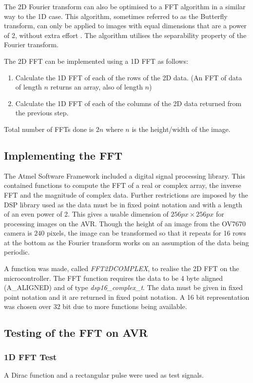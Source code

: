 The 2D Fourier transform can also be optimised to a FFT algorithm in a similar way to the 1D case. This algorithm, sometimes referred to as the Butterfly transform, can only be applied to images with equal dimensions that are a power of 2, without extra effort \citep{nixon2012feature}. The algorithm utilises the separability property of the Fourier transform. 

The 2D FFT can be implemented using a 1D FFT as follows:
\begin{enumerate}
\item Calculate the 1D FFT of each of the rows of the 2D data. (An FFT of data of length $n$ returns an array, also of length $n$)
\item Calculate the 1D FFT of each of the columns of the 2D data returned from the previous step.
\end{enumerate}
Total number of FFTs done is $2n$ where $n$ is the height/width of the image. 
\subsection{Implementing the FFT}
The Atmel Software Framework \citep{Atmel:ASF} included a digital signal processing library. This contained functions to compute the FFT of a real or complex array, the inverse FFT and the magnitude of complex data. Further restrictions are imposed by the DSP library used as the data must be in fixed point notation and with a length of an even power of 2. This gives a usable dimension of $256px \times 256px$ for processing images on the AVR. Though the height of an image from the OV7670 camera is $240$ pixels, the image can be transformed so that it repeats for 16 rows at the bottom as the Fourier transform works on an assumption of the data being periodic.

A function was made, called \textit{FFT2DCOMPLEX}, to realise the 2D FFT on the microcontroller. The FFT function requires the data to be 4 byte aligned (A\_ALIGNED) and of type \textit{dsp16\_complex\_t}. The data must be given in fixed point notation and it are returned in fixed point notation. A 16 bit representation was chosen over 32 bit due to more functions being available. 


\subsection{Testing of the FFT on AVR}
\subsubsection{1D FFT Test}
A Dirac function and a rectangular pulse were used as test signals. 

